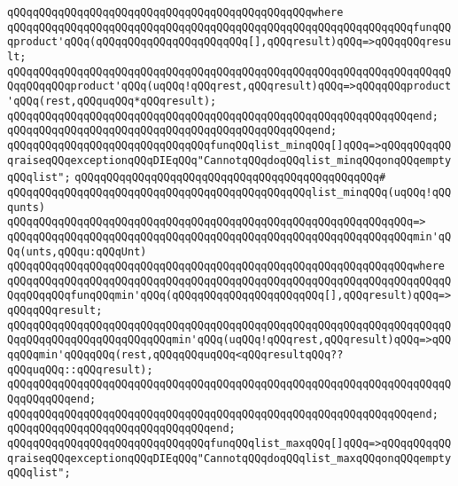 \verb|qQQqqQQqqQQqqQQqqQQqqQQqqQQqqQQqqQQqqQQqqQQqqQQqwhere|\newline
\verb|qQQqqQQqqQQqqQQqqQQqqQQqqQQqqQQqqQQqqQQqqQQqqQQqqQQqqQQqqQQqqQQqfunqQQqproduct'qQQq(qQQqqQQqqQQqqQQqqQQqqQQq[],qQQqresult)qQQq=>qQQqqQQqresult;|\newline
\verb|qQQqqQQqqQQqqQQqqQQqqQQqqQQqqQQqqQQqqQQqqQQqqQQqqQQqqQQqqQQqqQQqqQQqqQQqqQQqqQQqproduct'qQQq(uqQQq!qQQqrest,qQQqresult)qQQq=>qQQqqQQqproduct'qQQq(rest,qQQquqQQq*qQQqresult);|\newline
\verb|qQQqqQQqqQQqqQQqqQQqqQQqqQQqqQQqqQQqqQQqqQQqqQQqqQQqqQQqqQQqqQQqend;|\newline
\verb|qQQqqQQqqQQqqQQqqQQqqQQqqQQqqQQqqQQqqQQqqQQqqQQqend;|\newline
\newline
\verb|qQQqqQQqqQQqqQQqqQQqqQQqqQQqqQQqfunqQQqlist_minqQQq[]qQQq=>qQQqqQQqqQQqraiseqQQqexceptionqQQqDIEqQQq"CannotqQQqdoqQQqlist_minqQQqonqQQqemptyqQQqlist";|\newline
\verb|qQQqqQQqqQQqqQQqqQQqqQQqqQQqqQQqqQQqqQQqqQQqqQQq#|\newline
\verb|qQQqqQQqqQQqqQQqqQQqqQQqqQQqqQQqqQQqqQQqqQQqqQQqlist_minqQQq(uqQQq!qQQqunts)|\newline
\verb|qQQqqQQqqQQqqQQqqQQqqQQqqQQqqQQqqQQqqQQqqQQqqQQqqQQqqQQqqQQqqQQq=>|\newline
\verb|qQQqqQQqqQQqqQQqqQQqqQQqqQQqqQQqqQQqqQQqqQQqqQQqqQQqqQQqqQQqqQQqmin'qQQq(unts,qQQqu:qQQqUnt)|\newline
\verb|qQQqqQQqqQQqqQQqqQQqqQQqqQQqqQQqqQQqqQQqqQQqqQQqqQQqqQQqqQQqqQQqwhere|\newline
\verb|qQQqqQQqqQQqqQQqqQQqqQQqqQQqqQQqqQQqqQQqqQQqqQQqqQQqqQQqqQQqqQQqqQQqqQQqqQQqqQQqfunqQQqmin'qQQq(qQQqqQQqqQQqqQQqqQQqqQQq[],qQQqresult)qQQq=>qQQqqQQqresult;|\newline
\verb|qQQqqQQqqQQqqQQqqQQqqQQqqQQqqQQqqQQqqQQqqQQqqQQqqQQqqQQqqQQqqQQqqQQqqQQqqQQqqQQqqQQqqQQqqQQqqQQqmin'qQQq(uqQQq!qQQqrest,qQQqresult)qQQq=>qQQqqQQqmin'qQQqqQQq(rest,qQQqqQQquqQQq<qQQqresultqQQq??qQQquqQQq::qQQqresult);|\newline
\verb|qQQqqQQqqQQqqQQqqQQqqQQqqQQqqQQqqQQqqQQqqQQqqQQqqQQqqQQqqQQqqQQqqQQqqQQqqQQqqQQqend;|\newline
\verb|qQQqqQQqqQQqqQQqqQQqqQQqqQQqqQQqqQQqqQQqqQQqqQQqqQQqqQQqqQQqqQQqend;|\newline
\verb|qQQqqQQqqQQqqQQqqQQqqQQqqQQqqQQqend;|\newline
\newline
\verb|qQQqqQQqqQQqqQQqqQQqqQQqqQQqqQQqfunqQQqlist_maxqQQq[]qQQq=>qQQqqQQqqQQqraiseqQQqexceptionqQQqDIEqQQq"CannotqQQqdoqQQqlist_maxqQQqonqQQqemptyqQQqlist";|\newline
